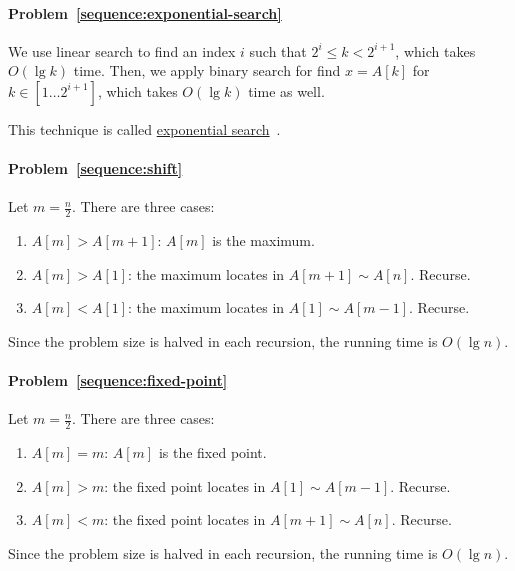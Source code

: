 \begin{Answer}
\paragraph{Problem~\ref{sequence:exponential-search}}
We use linear search to find an index $i$ such that $2^i \leq k < 2^{i+1}$, which takes $O(\lg k)$ time.
Then, we apply binary search for find $x = A[k]$ for $k \in [1 \dots 2^{i + 1}]$, which takes $O(\lg k)$ time as well.

\begin{remark}
This technique is called \href{https://en.wikipedia.org/wiki/Exponential_search}{exponential search}~\cite{Bentley1976}.
\end{remark}

\paragraph{Problem~\ref{sequence:shift}}
Let $m = \frac{n}{2}$. There are three cases:
\begin{enumerate}
\item $A[m] > A[m+1]$: $A[m]$ is the maximum.
\item $A[m] > A[1]$: the maximum locates in $A[m + 1] \sim A[n]$. Recurse.
\item $A[m] < A[1]$: the maximum locates in $A[1] \sim A[m-1]$. Recurse.
\end{enumerate}
Since the problem size is halved in each recursion, the running time is $O(\lg n)$.

\paragraph{Problem~\ref{sequence:fixed-point}}
Let $m = \frac{n}{2}$. There are three cases:
\begin{enumerate}
\item $A[m] = m$: $A[m]$ is the fixed point.
\item $A[m] > m$: the fixed point locates in $A[1] \sim A[m - 1]$. Recurse.
\item $A[m] < m$: the fixed point locates in $A[m + 1] \sim A[n]$. Recurse.
\end{enumerate}
Since the problem size is halved in each recursion, the running time is $O(\lg n)$.

\end{Answer}

